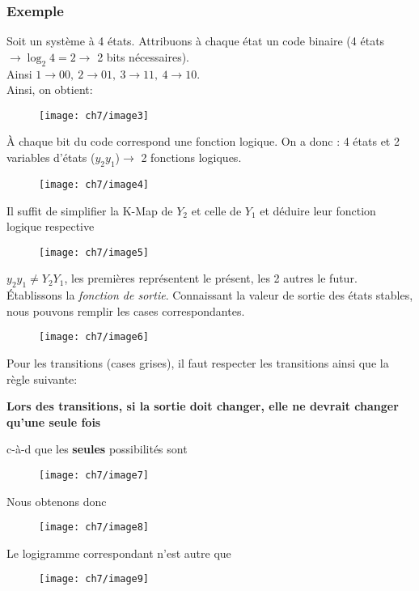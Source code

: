 \subsubsection{Exemple}
Soit un système à 4 états. Attribuons à chaque état un code binaire (4 états $\rightarrow \log_2 4=2\rightarrow$ 2 bits nécessaires).\\
Ainsi $1\rightarrow 00,\ 2\rightarrow 01,\ 3\rightarrow 11,\ 4\rightarrow 10$.\\
Ainsi, on obtient:
\begin{figure}[H]
	\centering
	\texttt{[image: ch7/image3]}
\end{figure}
À chaque bit du code correspond une fonction logique. On a donc : 4 états et 2 variables d'états ($y_2y_1$)$\rightarrow$ 2 fonctions logiques.
\begin{figure}[H]
	\centering
	\texttt{[image: ch7/image4]}
\end{figure}
Il suffit de simplifier la K-Map de $Y_2$ et celle de $Y_1$ et déduire leur fonction logique respective
\begin{figure}[H]
	\centering
	\texttt{[image: ch7/image5]}
\end{figure}
\danger $y_2y_1\neq Y_2Y_1$, les premières représentent le présent, les 2 autres le futur.\\

Établissons la \textit{fonction de sortie}. Connaissant la valeur de sortie des états stables, nous pouvons remplir les cases correspondantes.
\begin{figure}[H]
	\centering
	\texttt{[image: ch7/image6]}
\end{figure} Pour les transitions (cases grises), il faut respecter les transitions ainsi que la règle suivante:
\begin{center}
	\textbf{Lors des transitions, si la sortie doit changer, elle ne devrait changer qu'une seule fois}
\end{center}
c-à-d que les \textbf{seules} possibilités sont
\begin{figure}[H]
	\centering
	\texttt{[image: ch7/image7]}
\end{figure}
Nous obtenons donc
\begin{figure}[H]
	\centering
	\texttt{[image: ch7/image8]}
\end{figure}
Le logigramme correspondant n'est autre que
\begin{figure}[H]
	\centering
	\texttt{[image: ch7/image9]}
\end{figure}
